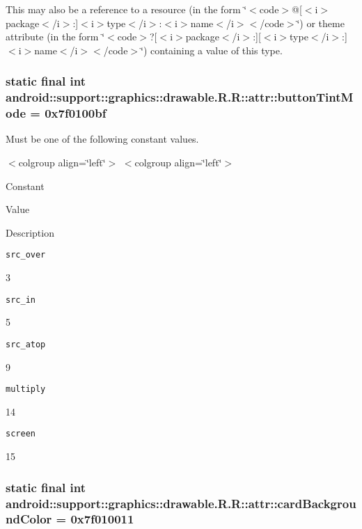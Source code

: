 This may also be a reference to a resource (in the form \char`\"{}$<$code$>$@\mbox{[}$<$i$>$package$<$/i$>$:\mbox{]}$<$i$>$type$<$/i$>$:$<$i$>$name$<$/i$>$$<$/code$>$\char`\"{}) or theme attribute (in the form \char`\"{}$<$code$>$?\mbox{[}$<$i$>$package$<$/i$>$:\mbox{]}\mbox{[}$<$i$>$type$<$/i$>$:\mbox{]}$<$i$>$name$<$/i$>$$<$/code$>$\char`\"{}) containing a value of this type. \hypertarget{classandroid_1_1support_1_1graphics_1_1drawable_1_1_r_1_1attr_bfd86900ae8f7fd6ba1f69dc6069b0ac}{
\subsubsection[{buttonTintMode}]{\setlength{\rightskip}{0pt plus 5cm}static final int android::support::graphics::drawable.R.R::attr::buttonTintMode = 0x7f0100bf}}
\label{classandroid_1_1support_1_1graphics_1_1drawable_1_1_r_1_1attr_bfd86900ae8f7fd6ba1f69dc6069b0ac}


Must be one of the following constant values. \begin{TabularC}{0}
\hline
\end{TabularC}
$<$colgroup align=\char`\"{}left\char`\"{}$>$ $<$colgroup align=\char`\"{}left\char`\"{}$>$ 

Constant

Value

Description 

{\tt src\_\-over}

3

{\tt src\_\-in}

5

{\tt src\_\-atop}

9

{\tt multiply}

14

{\tt screen}

15\hypertarget{classandroid_1_1support_1_1graphics_1_1drawable_1_1_r_1_1attr_728faebb8f2fa52aa186fb6e10737f84}{
\subsubsection[{cardBackgroundColor}]{\setlength{\rightskip}{0pt plus 5cm}static final int android::support::graphics::drawable.R.R::attr::cardBackgroundColor = 0x7f010011}}
\label{classandroid_1_1support_1_1graphics_1_1drawable_1_1_r_1_1attr_728faebb8f2fa52aa186fb6e10737f84}


